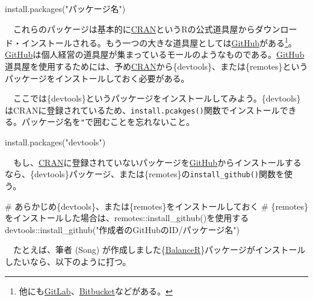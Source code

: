 \documentclass[
  a4paper,
  pandoc,
  ja=standard,
  jafont=haranoaji]{bxjsbook}
\newenvironment{Shaded}{\begin{snugshade}}{\end{snugshade}}
\newcommand{\CommentTok}[1]{\textcolor[rgb]{0.37,0.37,0.37}{#1}}
\newcommand{\FunctionTok}[1]{\textcolor[rgb]{0.28,0.35,0.67}{#1}}
\newcommand{\NormalTok}[1]{\textcolor[rgb]{0.00,0.48,0.65}{#1}}
\newcommand{\SpecialCharTok}[1]{\textcolor[rgb]{0.37,0.37,0.37}{#1}}
\newcommand{\StringTok}[1]{\textcolor[rgb]{0.13,0.47,0.30}{#1}}
\begin{document}
\begin{Shaded}
\begin{Highlighting}[numbers=left,,]
\FunctionTok{install.packages}\NormalTok{(}\StringTok{"パッケージ名"}\NormalTok{)}
\end{Highlighting}
\end{Shaded}

　これらのパッケージは基本的に\href{https://cran.r-project.org}{CRAN}というRの公式道具屋からダウンロード・インストールされる。もう一つの大きな道具屋としては\href{https://github.com}{GitHub}がある\footnote{他にも\href{https://about.gitlab.com}{GitLab}、\href{https://bitbucket.org/product/}{Bitbucket}などがある。}。\href{https://github.com}{GitHub}は個人経営の道具屋が集まっているモールのようなものである。\href{https://github.com}{GitHub}道具屋を使用するためには、予め\href{https://cran.r-project.org}{CRAN}から\{devtools\}、または\{remotes\}というパッケージをインストールしておく必要がある。

　ここでは\{devtools\}というパッケージをインストールしてみよう。\{devtools\}はCRANに登録されているため、\texttt{install.pcakges()}関数でインストールできる。パッケージ名を\texttt{"}で囲むことを忘れないこと。

\begin{Shaded}
\begin{Highlighting}[numbers=left,,]
\FunctionTok{install.packages}\NormalTok{(}\StringTok{"devtools"}\NormalTok{)}
\end{Highlighting}
\end{Shaded}

　もし、\href{https://cran.r-project.org}{CRAN}に登録されていないパッケージを\href{https://github.com}{GitHub}からインストールするなら、\{devtools\}パッケージ、または\{remotes\}の\texttt{install\_github()}関数を使う。

\begin{Shaded}
\begin{Highlighting}[numbers=left,,]
\CommentTok{\# あらかじめ\{devtools\}、または\{remotes\}をインストールしておく}
\CommentTok{\# \{remotes\}をインストールした場合は、remotes::install\_github()を使用する}
\NormalTok{devtools}\SpecialCharTok{::}\FunctionTok{install\_github}\NormalTok{(}\StringTok{"作成者のGitHubのID/パッケージ名"}\NormalTok{)}
\end{Highlighting}
\end{Shaded}

　たとえば、筆者 (Song)
が作成しました\{\href{https://github.com/JaehyunSong/BalanceR}{BalanceR}\}パッケージがインストールしたいなら、以下のように打つ。
\end{document}
